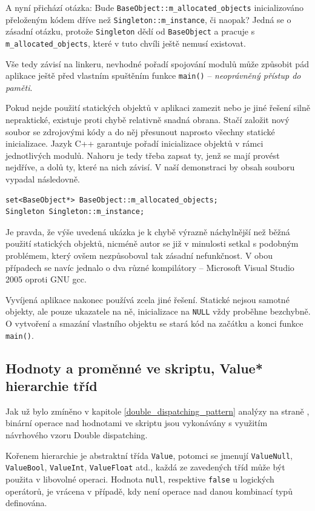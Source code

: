 \documentclass[11pt,twoside,a4paper]{book}
\begin{document}
A nyní přichází otázka: Bude \texttt{BaseObject::m\_allocated\_objects} inicializováno přeloženým kódem dříve než \texttt{Singleton::m\_instance}, či naopak? Jedná se o zásadní otázku, protože \texttt{Singleton} dědí od \texttt{BaseObject} a pracuje s \texttt{m\_allocated\_objects}, které v tuto chvíli ještě nemusí existovat.

Vše tedy závisí na linkeru, nevhodné pořadí spojování modulů může způsobit pád aplikace ještě před vlastním spuštěním funkce \texttt{main()} -- \textit{neoprávněný přístup do paměti}.

Pokud nejde použití statických objektů v aplikaci zamezit nebo je jiné řešení silně nepraktické, existuje proti chybě relativně snadná obrana. Stačí založit nový soubor se zdrojovými kódy a do něj přesunout naprosto všechny statické inicializace. Jazyk C++ garantuje pořadí inicializace objektů v rámci jednotlivých modulů. Nahoru je tedy třeba zapsat ty, jenž se mají provést nejdříve, a dolů ty, které na nich závisí. V naší demonstraci by obsah souboru vypadal následovně.

\begin{verbatim}
set<BaseObject*> BaseObject::m_allocated_objects;
Singleton Singleton::m_instance;
\end{verbatim}

Je pravda, že výše uvedená ukázka je k chybě výrazně náchylnější než běžná použití statických objektů, nicméně autor se již v minulosti setkal s podobným problémem, který ovšem nezpůsoboval tak zásadní nefunkčnost. V obou případech se navíc jednalo o dva různé kompilátory -- Microsoft Visual Studio 2005 oproti GNU gcc.

Vyvíjená aplikace nakonec používá zcela jiné řešení. Statické nejsou samotné objekty, ale pouze ukazatele na ně, inicializace na \texttt{NULL} vždy proběhne bezchybně. O vytvoření a smazání vlastního objektu se stará kód na začátku a konci funkce \texttt{main()}.


\subsection{Hodnoty a proměnné ve skriptu, Value* hierarchie tříd}

Jak už bylo zmíněno v kapitole \ref{double_dispatching_pattern} analýzy na straně \pageref{double_dispatching_pattern}, binární operace nad hodnotami ve skriptu jsou vykonávány s využitím návrhového vzoru Double dispatching.

Kořenem hierarchie je abstraktní třída \texttt{Value}, potomci se jmenují \texttt{ValueNull}, \texttt{Va\-lue\-Bool}, \texttt{ValueInt}, \texttt{ValueFloat} atd., každá ze zavedených tříd může být použita v libovolné operaci. Hodnota \texttt{null}, respektive \texttt{false} u logických operátorů, je vrácena v případě, kdy není operace nad danou kombinací typů definována.
\end{document}
